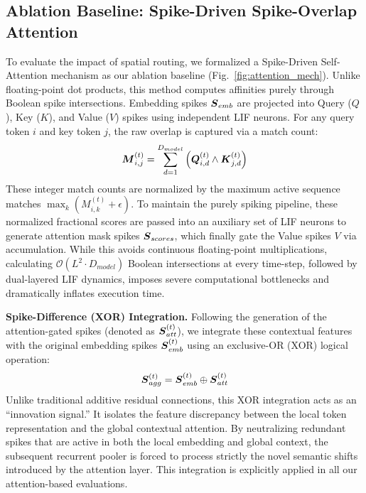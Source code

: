 \documentclass[11pt, conference, compsoc, twoside]{IEEEtran}
\begin{document}
\subsection{Ablation Baseline: Spike-Driven Spike-Overlap Attention}
To evaluate the impact of spatial routing, we formalized a Spike-Driven Self-Attention mechanism as our ablation baseline (Fig.~\ref{fig:attention_mech}). Unlike floating-point dot products, this method computes affinities purely through Boolean spike intersections. Embedding spikes $\boldsymbol{S}_{emb}$ are projected into Query ($Q$), Key ($K$), and Value ($V$) spikes using independent LIF neurons. For any query token $i$ and key token $j$, the raw overlap is captured via a match count:
\begin{equation}
\boldsymbol{M}_{i,j}^{(t)} = \sum_{d=1}^{D_{model}} \left( \boldsymbol{Q}_{i,d}^{(t)} \wedge \boldsymbol{K}_{j,d}^{(t)} \right)
\end{equation}
These integer match counts are normalized by the maximum active sequence matches $\max_k (M_{i,k}^{(t)} + \epsilon)$. To maintain the purely spiking pipeline, these normalized fractional scores are passed into an auxiliary set of LIF neurons to generate attention mask spikes $\boldsymbol{S}_{scores}$, which finally gate the Value spikes $V$ via accumulation. While this avoids continuous floating-point multiplications, calculating $\mathcal{O}(L^2 \cdot D_{model})$ Boolean intersections at every time-step, followed by dual-layered LIF dynamics, imposes severe computational bottlenecks and dramatically inflates execution time.

\textbf{Spike-Difference (XOR) Integration.} Following the generation of the attention-gated spikes (denoted as $\boldsymbol{S}_{att}^{(t)}$), we integrate these contextual features with the original embedding spikes $\boldsymbol{S}_{emb}^{(t)}$ using an exclusive-OR (XOR) logical operation:
\begin{equation}
\boldsymbol{S}_{agg}^{(t)} = \boldsymbol{S}_{emb}^{(t)} \oplus \boldsymbol{S}_{att}^{(t)}
\end{equation}
Unlike traditional additive residual connections, this XOR integration acts as an ``innovation signal.'' It isolates the feature discrepancy between the local token representation and the global contextual attention. By neutralizing redundant spikes that are active in both the local embedding and global context, the subsequent recurrent pooler is forced to process strictly the novel semantic shifts introduced by the attention layer. This integration is explicitly applied in all our attention-based evaluations.
\end{document}
